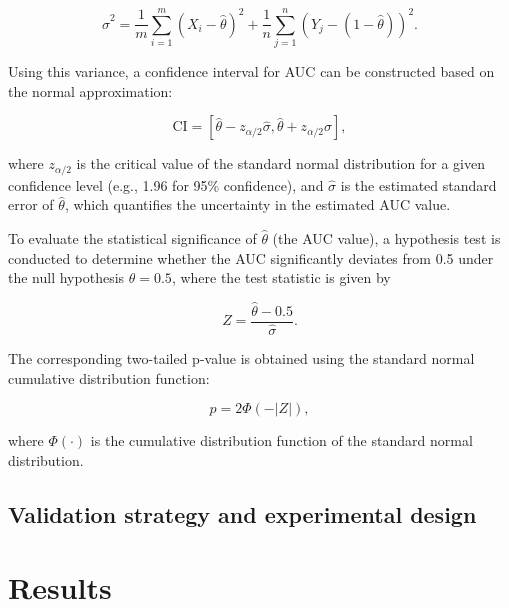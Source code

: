 \documentclass[authoryear,preprint,review,12pt]{elsarticle}
\begin{document}
\begin{equation}
\hat{\sigma}^2 = \frac{1}{m} \sum_{i=1}^{m} \left( X_i - \hat{\theta} \right)^2 + \frac{1}{n} \sum_{j=1}^{n} \left( Y_j - (1 - \hat{\theta}) \right)^2.
\end{equation}

Using this variance, a confidence interval for AUC can be constructed based on the normal approximation:

\begin{equation}
\text{CI} = \left[ \hat{\theta} - z_{\alpha/2} \hat{\sigma}, \hat{\theta} + z_{\alpha/2} \hat{\sigma} \right],
\end{equation}

\noindent where \( z_{\alpha/2} \) is the critical value of the standard normal distribution for a given confidence level (e.g., 1.96 for 95\% confidence), and \(\hat{\sigma} \) is the estimated standard error of \(\hat{\theta}\), which quantifies the uncertainty in the estimated AUC value.

To evaluate the statistical significance of \(\hat{\theta}\) (the AUC value), a hypothesis test is conducted to determine whether the AUC significantly deviates from 0.5 under the null hypothesis \(\theta = 0.5\), where the test statistic is given by

\begin{equation}
Z = \frac{\hat{\theta} - 0.5}{\hat{\sigma}}.
\end{equation}

The corresponding two-tailed p-value is obtained using the standard normal cumulative distribution function:

\begin{equation}
p = 2 \Phi(-|Z|),
\end{equation}

\noindent where \(\Phi(\cdot)\) is the cumulative distribution function of the standard normal distribution. 

\subsection{Validation strategy and experimental design}

\section{Results}\label{sec3} 
\end{document}
